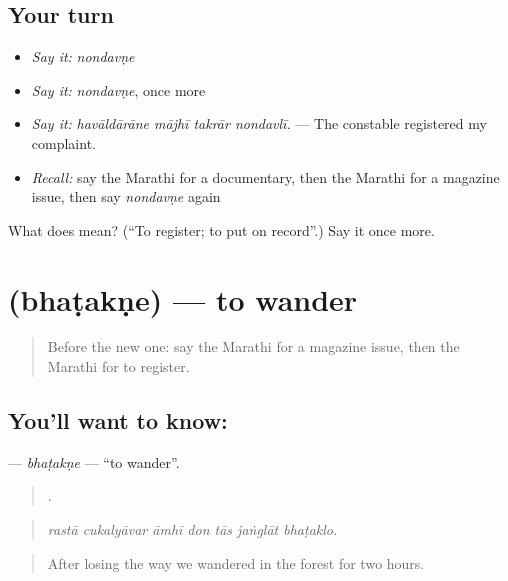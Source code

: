 \subsection*{Your turn}
\begin{itemize}
\raggedright
  \item \emph{Say it:} \emph{nondavṇe}
  \item \emph{Say it:} \emph{nondavṇe}, once more
  \item \emph{Say it:} \emph{havāldārāne mājhī takrār nondavlī.} — The constable registered my complaint.
  \item \emph{Recall:} say the Marathi for a documentary, then the Marathi for a magazine issue, then say \emph{nondavṇe} again
\end{itemize}

\begin{tcolorbox}[breakable,colback=teal!4,colframe=teal!35!black,title={Before you move on}]
What does  mean? (\textquotedblleft{}To register; to put on record\textquotedblright{}.) Say it once more.
\end{tcolorbox}
\section[\texorpdfstring{\mr{भटकणे} (bhaṭakṇe)}{भटकणे (bhaṭakṇe)}]{ (bhaṭakṇe) — to wander}

\label{lesson:MR-C315-bhatakne}



\begin{quote}
Before the new one: say the Marathi for a magazine issue, then the Marathi for to register.
\end{quote}

\subsection*{You'll want to know: }
\textbf{} — \emph{bhaṭakṇe} — \textquotedblleft{}to wander\textquotedblright{}.

\begin{quote}
      .
\end{quote}

\begin{quote}
\emph{rastā cukalyāvar āmhī don tās jaṅglāt bhaṭaklo.}
\end{quote}

\begin{quote}
After losing the way we wandered in the forest for two hours.
\end{quote}

